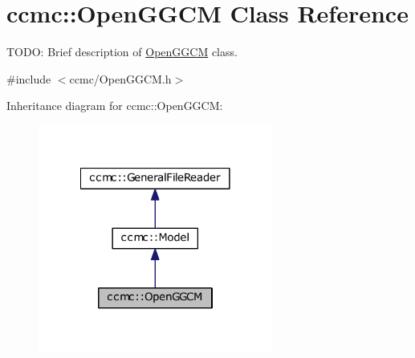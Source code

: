 \hypertarget{classccmc_1_1_open_g_g_c_m}{\section{ccmc\-:\-:Open\-G\-G\-C\-M Class Reference}
\label{classccmc_1_1_open_g_g_c_m}
}


T\-O\-D\-O\-: Brief description of \hyperlink{classccmc_1_1_open_g_g_c_m}{Open\-G\-G\-C\-M} class.  




{\ttfamily \#include $<$ccmc/\-Open\-G\-G\-C\-M.\-h$>$}



Inheritance diagram for ccmc\-:\-:Open\-G\-G\-C\-M\-:
\nopagebreak
\begin{figure}[H]
\begin{center}
\leavevmode
\includegraphics[width=218pt]{classccmc_1_1_open_g_g_c_m__inherit__graph}
\end{center}
\end{figure}


